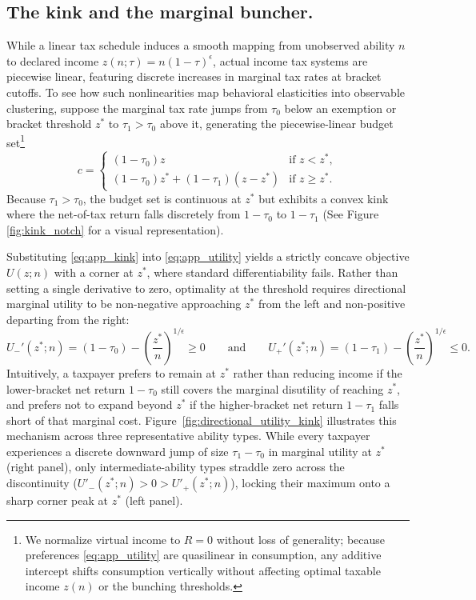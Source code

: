 \subsection{The kink and the marginal buncher.}
While a linear tax schedule induces a smooth mapping from unobserved ability $n$ to declared income $z(n;\tau) = n(1-\tau)^{\epsilon}$, actual income tax systems are piecewise linear, featuring discrete increases in marginal tax rates at bracket cutoffs. To see how such nonlinearities map behavioral elasticities into observable clustering, suppose the marginal tax rate jumps from $\tau_0$ below an exemption or bracket threshold $z^*$ to $\tau_1 > \tau_0$ above it, generating the piecewise-linear budget set\footnote{We normalize virtual income to $R = 0$ without loss of generality; because preferences \eqref{eq:app_utility} are quasilinear in consumption, any additive intercept shifts consumption vertically without affecting optimal taxable income $z(n)$ or the bunching thresholds.}
\begin{equation}
c = \begin{cases}
(1-\tau_0)z & \text{if } z < z^{*},\\[2pt]
(1-\tau_0)z^{*} + (1-\tau_1)(z-z^{*}) & \text{if } z \ge z^{*}.
\end{cases}
\label{eq:app_kink}
\end{equation}
Because $\tau_1 > \tau_0$, the budget set is continuous at $z^*$ but exhibits a convex kink where the net-of-tax return falls discretely from $1-\tau_0$ to $1-\tau_1$ (See Figure \ref{fig:kink_notch} for a visual representation). 

Substituting \eqref{eq:app_kink} into \eqref{eq:app_utility} yields a strictly concave objective $U(z;n)$ with a corner at $z^*$, where standard differentiability fails. Rather than setting a single derivative to zero, optimality at the threshold requires directional marginal utility to be non-negative approaching $z^*$ from the left and non-positive departing from the right:
\begin{equation}
U_{-}'(z^*;n) = (1-\tau_0) - \left(\frac{z^*}{n}\right)^{1/\epsilon} \ge 0
\qquad\text{and}\qquad
U_{+}'(z^*;n) = (1-\tau_1) - \left(\frac{z^*}{n}\right)^{1/\epsilon} \le 0.
\label{eq:app_directional}
\end{equation}
Intuitively, a taxpayer prefers to remain at $z^*$ rather than reducing income if the lower-bracket net return $1-\tau_0$ still covers the marginal disutility of reaching $z^*$, and prefers not to expand beyond $z^*$ if the higher-bracket net return $1-\tau_1$ falls short of that marginal cost. Figure~\ref{fig:directional_utility_kink} illustrates this mechanism across three representative ability types. While every taxpayer experiences a discrete downward jump of size $\tau_1 - \tau_0$ in marginal utility at $z^*$ (right panel), only intermediate-ability types straddle zero across the discontinuity ($U'_-(z^*;n) > 0 > U'_+(z^*;n)$), locking their maximum onto a sharp corner peak at $z^*$ (left panel).

